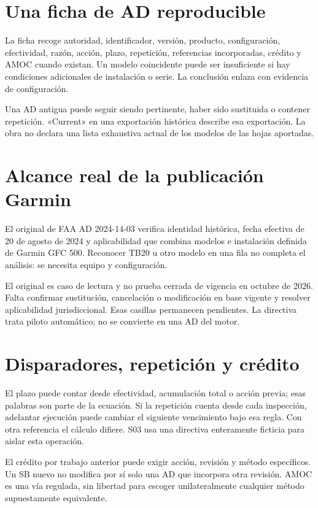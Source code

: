 
\section{Una ficha de AD reproducible}
La ficha recoge autoridad, identificador, versión, producto, configuración, efectividad, razón, acción, plazo, repetición, referencias incorporadas, crédito y AMOC cuando existan. Un modelo coincidente puede ser insuficiente si hay condiciones adicionales de instalación o serie. La conclusión enlaza con evidencia de configuración.

Una AD antigua puede seguir siendo pertinente, haber sido sustituida o contener repetición. «Current» en una exportación histórica describe esa exportación. La obra no declara una lista exhaustiva actual de los modelos de las hojas aportadas.
\section{Alcance real de la publicación Garmin}
El original de FAA AD 2024-14-03 verifica identidad histórica, fecha efectiva de 20 de agosto de 2024 y aplicabilidad que combina modelos e instalación definida de Garmin GFC 500. Reconocer TB20 u otro modelo en una fila no completa el análisis: se necesita equipo y configuración.

El original es caso de lectura y no prueba cerrada de vigencia en octubre de 2026. Falta confirmar sustitución, cancelación o modificación en base vigente y resolver aplicabilidad jurisdiccional. Esas casillas permanecen pendientes. La directiva trata piloto automático; no se convierte en una AD del motor.
\section{Disparadores, repetición y crédito}
El plazo puede contar desde efectividad, acumulación total o acción previa; esas palabras son parte de la ecuación. Si la repetición cuenta desde cada inspección, adelantar ejecución puede cambiar el siguiente vencimiento bajo esa regla. Con otra referencia el cálculo difiere. S03 usa una directiva enteramente ficticia para aislar esta operación.

El crédito por trabajo anterior puede exigir acción, revisión y método específicos. Un SB nuevo no modifica por sí solo una AD que incorpora otra revisión. AMOC es una vía regulada, sin libertad para escoger unilateralmente cualquier método supuestamente equivalente.
